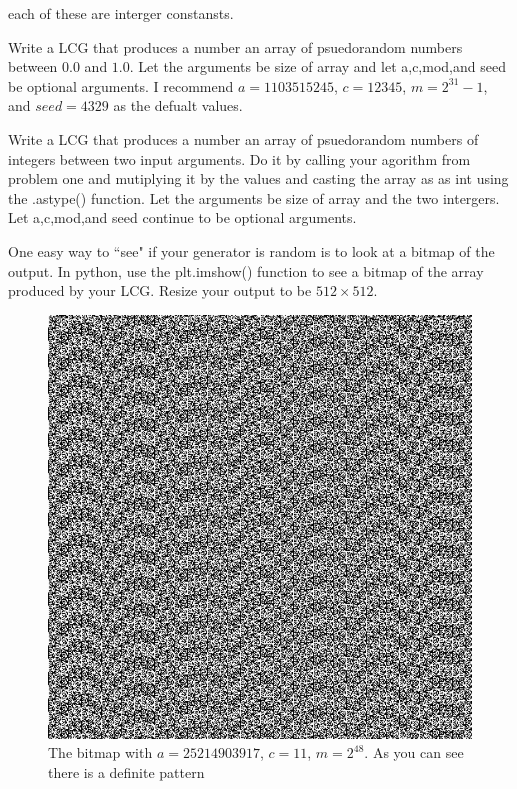 each of these are interger constansts.



\begin{problem}
Write a LCG that produces a number an array of psuedorandom numbers between $0.0$ and $1.0$. Let the arguments be size of array and let a,c,mod,and seed be optional arguments. I recommend $a=1103515245$, $c=12345$, $m=2^{31}-1$, and $seed=4329$ as the defualt values.
\end{problem}

\begin{problem}
Write a LCG that produces a number an array of psuedorandom numbers of integers between two input arguments. Do it by calling your agorithm from problem one and mutiplying it by the values and casting the array as as int using the .astype() function. Let the arguments be size of array and the two intergers. Let a,c,mod,and seed continue to be optional arguments.
\end{problem}

One easy way to ``see" if your generator is random is to look at a bitmap of the output. In python, use the plt.imshow() function to see a bitmap of the array produced by your LCG. Resize your output to be $512 \times 512$. 

\begin{figure}[H]
\includegraphics[scale = .4]{PRNG1.jpg}
\caption{The bitmap with $a=25214903917$, $c=11$, $m=2^{48}$. As you can see there is a definite pattern}
\end{figure}

